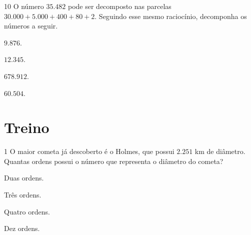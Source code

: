 \num{10}  O número $35.482$ pode ser decomposto nas parcelas $30.000 + 5.000 +
400 + 80 + 2$. Seguindo esse mesmo raciocínio, decomponha os números a seguir.

\begin{escolha}
\item $9.876$.\\

\item $12.345$.\\

\item $678.912$.\\

\item $60.504$.\\
\end{escolha}

\section*{Treino}

\num{1} O maior cometa já descoberto é o Holmes, que possui $2.251$ km de
diâmetro. Quantas ordens possui o número que representa o diâmetro do cometa?

\begin{escolha}
\item Duas ordens.
\item Três ordens.
\item Quatro ordens.
\item Dez ordens.
\end{escolha}





